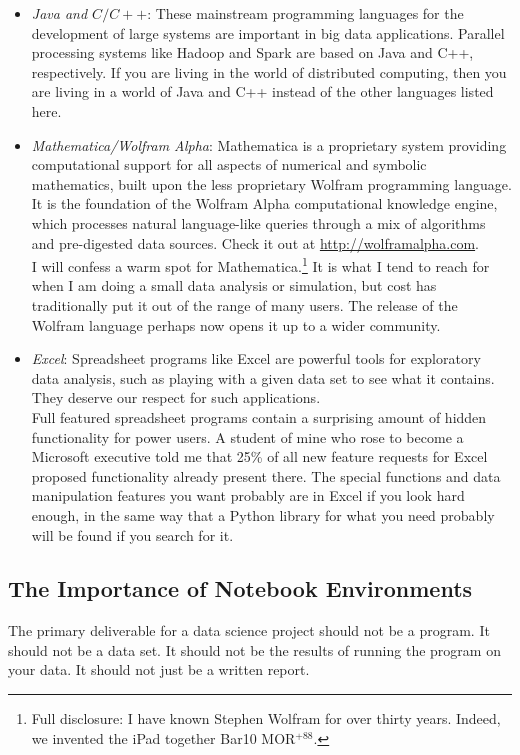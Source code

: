 \documentclass[10pt]{article}
\begin{document}

\begin{itemize}
  \item \textit{Java and $C / C++$}: These mainstream programming languages for the development of large systems are important in big data applications. Parallel processing systems like Hadoop and Spark are based on Java and C++, respectively. If you are living in the world of distributed computing, then you are living in a world of Java and C++ instead of the other languages listed here.
  \item \textit{Mathematica/Wolfram Alpha}: Mathematica is a proprietary system providing computational support for all aspects of numerical and symbolic mathematics, built upon the less proprietary Wolfram programming language. It is the foundation of the Wolfram Alpha computational knowledge engine, which processes natural language-like queries through a mix of algorithms and pre-digested data sources. Check it out at \href{http://wolframalpha.com}{http://wolframalpha.com}.\\
I will confess a warm spot for Mathematica.\footnote{Full disclosure: I have known Stephen Wolfram for over thirty years. Indeed, we invented the iPad together Bar10 MOR$^{+88}$.} It is what I tend to reach for when I am doing a small data analysis or simulation, but cost has traditionally put it out of the range of many users. The release of the Wolfram language perhaps now opens it up to a wider community.
  \item \textit{Excel}: Spreadsheet programs like Excel are powerful tools for exploratory data analysis, such as playing with a given data set to see what it contains. They deserve our respect for such applications.\\
Full featured spreadsheet programs contain a surprising amount of hidden functionality for power users. A student of mine who rose to become a Microsoft executive told me that 25\% of all new feature requests for Excel proposed functionality already present there. The special functions and data manipulation features you want probably are in Excel if you look hard enough, in the same way that a Python library for what you need probably will be found if you search for it.
\end{itemize}

\subsection*{The Importance of Notebook Environments}
The primary deliverable for a data science project should not be a program. It should not be a data set. It should not be the results of running the program on your data. It should not just be a written report.
\end{document}
